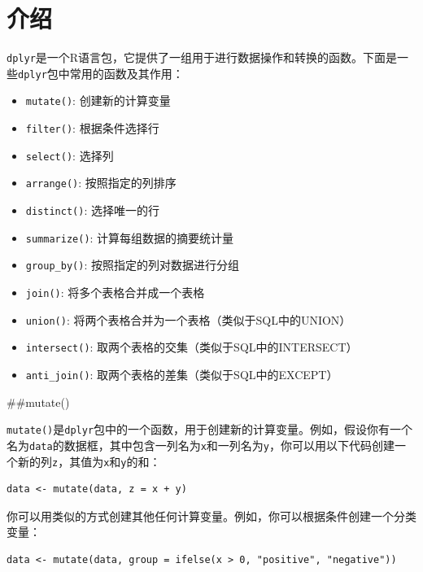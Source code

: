\documentclass[
  letterpaper,
  DIV=11,
  numbers=noendperiod]{scrreprt}
\providecommand{\tightlist}{%
  \setlength{\itemsep}{0pt}\setlength{\parskip}{0pt}}\usepackage{longtable,booktabs,array}
\begin{document}
\hypertarget{section}{%
\chapter{}\label{section}}

\hypertarget{ux4ecbux7ecd}{%
\chapter{介绍}\label{ux4ecbux7ecd}}

\texttt{dplyr}是一个R语言包，它提供了一组用于进行数据操作和转换的函数。下面是一些\texttt{dplyr}包中常用的函数及其作用：

\begin{itemize}
\tightlist
\item
  \texttt{mutate()}: 创建新的计算变量
\item
  \texttt{filter()}: 根据条件选择行
\item
  \texttt{select()}: 选择列
\item
  \texttt{arrange()}: 按照指定的列排序
\item
  \texttt{distinct()}: 选择唯一的行
\item
  \texttt{summarize()}: 计算每组数据的摘要统计量
\item
  \texttt{group\_by()}: 按照指定的列对数据进行分组
\item
  \texttt{join()}: 将多个表格合并成一个表格
\item
  \texttt{union()}: 将两个表格合并为一个表格（类似于SQL中的UNION）
\item
  \texttt{intersect()}: 取两个表格的交集（类似于SQL中的INTERSECT）
\item
  \texttt{anti\_join()}: 取两个表格的差集（类似于SQL中的EXCEPT）
\end{itemize}

\#\#mutate()

\texttt{mutate()}是\texttt{dplyr}包中的一个函数，用于创建新的计算变量。例如，假设你有一个名为\texttt{data}的数据框，其中包含一列名为\texttt{x}和一列名为\texttt{y}，你可以用以下代码创建一个新的列\texttt{z}，其值为\texttt{x}和\texttt{y}的和：

\begin{verbatim}
data <- mutate(data, z = x + y)
\end{verbatim}

你可以用类似的方式创建其他任何计算变量。例如，你可以根据条件创建一个分类变量：

\begin{verbatim}
data <- mutate(data, group = ifelse(x > 0, "positive", "negative"))
\end{verbatim}
\end{document}
